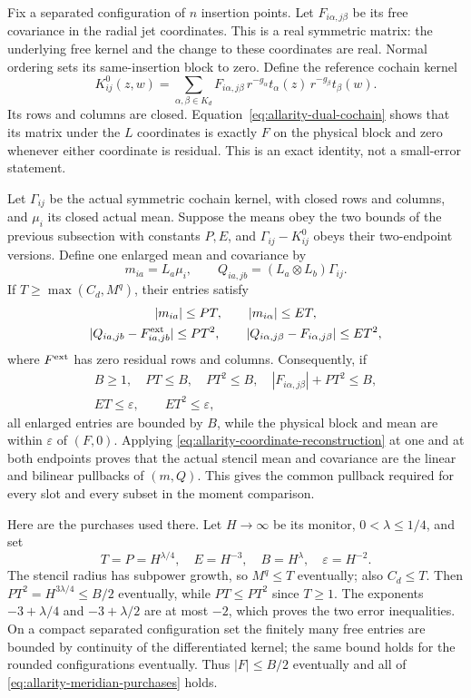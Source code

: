 Fix a separated configuration of $n$ insertion points. Let
$F_{i\alpha,j\beta}$ be its free covariance in the radial jet
coordinates. This is a real symmetric matrix: the underlying
free kernel and the change to these coordinates are real. Normal
ordering sets its same-insertion block to zero. Define the reference
cochain kernel
\[
 K^0_{ij}(z,w)=\sum_{\alpha,\beta\in K_d}
 F_{i\alpha,j\beta}\,
 r^{-g_\alpha}t_\alpha(z)\,
 r^{-g_\beta}t_\beta(w).
\]
Its rows and columns are closed. Equation~\eqref{eq:allarity-dual-cochain}
shows that its matrix under the $L$ coordinates is exactly $F$
on the physical block and zero whenever either coordinate is
residual. This is an exact identity, not a small-error statement.

Let $\Gamma_{ij}$ be the actual symmetric cochain kernel, with closed
rows and columns, and $\mu_i$ its closed actual mean. Suppose the means obey the two bounds
of the previous subsection with constants $P,E$, and
$\Gamma_{ij}-K^0_{ij}$ obeys their two-endpoint versions. Define
one enlarged mean and covariance by
\[
 m_{ia}=L_a\mu_i,\qquad
 Q_{ia,jb}=(L_a\otimes L_b)\Gamma_{ij}.
\]
If $T\ge\max(C_d,M^q)$, their entries satisfy
\begin{gather*}
 |m_{ia}|\le PT,\qquad |m_{i\alpha}|\le ET,\\
 |Q_{ia,jb}-F^{\rm ext}_{ia,jb}|\le PT^2,\qquad
 |Q_{i\alpha,j\beta}-F_{i\alpha,j\beta}|\le ET^2,
\end{gather*}
where $F^{\rm ext}$ has zero residual rows and columns. Consequently,
if
\begin{gather}\label{eq:allarity-meridian-purchases}
 B\ge1,\quad PT\le B,\quad PT^2\le B,\quad
 |F_{i\alpha,j\beta}|+PT^2\le B,\\
 ET\le\varepsilon,\qquad ET^2\le\varepsilon,
\end{gather}
all enlarged entries are bounded by $B$, while the physical
block and mean are within $\varepsilon$ of $(F,0)$.
Applying \eqref{eq:allarity-coordinate-reconstruction} at one and
at both endpoints proves that the actual stencil mean and covariance
are the linear and bilinear pullbacks of $(m,Q)$. This gives the
common pullback required for every slot and every subset in the
moment comparison.

Here are the purchases used there. Let $H\to\infty$ be its monitor,
$0<\lambda\le1/4$, and set
\[
 T=P=H^{\lambda/4},\quad E=H^{-3},\quad
 B=H^\lambda,\quad\varepsilon=H^{-2}.
\]
The stencil radius has subpower growth, so $M^q\le T$ eventually;
also $C_d\le T$. Then $PT^2=H^{3\lambda/4}\le B/2$
eventually, while $PT\le PT^2$ since $T\ge1$.
The exponents $-3+\lambda/4$ and $-3+\lambda/2$ are at most $-2$,
which proves the two error inequalities. On a compact separated
configuration set the finitely many free entries are bounded by
continuity of the differentiated kernel; the same bound holds for
the rounded configurations eventually. Thus $|F|\le B/2$
eventually and all of \eqref{eq:allarity-meridian-purchases} holds.

